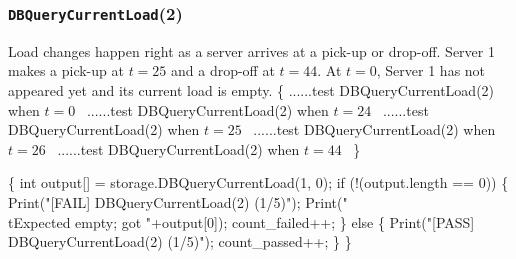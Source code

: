 \documentclass{article}
\def\nwendcode{\endtrivlist \endgroup}
\let\nwdocspar=\par
\theoremstyle{definition}
\begin{document}
\subsubsection{{\tt{}DBQueryCurrentLoad}(2)}
Load changes happen right as a server arrives at a pick-up or drop-off.
Server 1 makes a pick-up at $t=25$ and a drop-off at $t=44$. At $t=0$, Server 1
has not appeared yet and its current load is empty.
\nwenddocs{}\endmoddef{}
\{
  \LA{}......test \code{}DBQueryCurrentLoad\edoc{}(2) when $t=0$~{\nwtagstyle{}}\RA{}
  \LA{}......test \code{}DBQueryCurrentLoad\edoc{}(2) when $t=24$~{\nwtagstyle{}}\RA{}
  \LA{}......test \code{}DBQueryCurrentLoad\edoc{}(2) when $t=25$~{\nwtagstyle{}}\RA{}
  \LA{}......test \code{}DBQueryCurrentLoad\edoc{}(2) when $t=26$~{\nwtagstyle{}}\RA{}
  \LA{}......test \code{}DBQueryCurrentLoad\edoc{}(2) when $t=44$~{\nwtagstyle{}}\RA{}
\}
\nwendcode{}\nwdocspar
\nwenddocs{}\endmoddef{}
\{
  int output[] = storage.DBQueryCurrentLoad(1, 0);
  if (!(output.length == 0)) \{
    Print("[FAIL] DBQueryCurrentLoad(2) (1/5)");
    Print("\\tExpected empty; got "+output[0]);
    count_failed++;
  \} else \{
    Print("[PASS] DBQueryCurrentLoad(2) (1/5)");
    count_passed++;
  \}
\}
\nwendcode{}\nwdocspar
\nwenddocs{}\endmoddef{}
\end{document}
